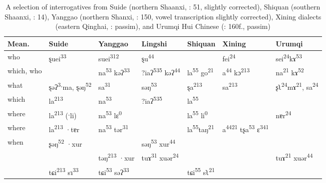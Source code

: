 \begin{table}[p]
\caption{A selection of interrogatives from Suide (northern Shaanxi, \citealt{Hei2013}: 51, slightly corrected), Shiquan (southern Shaanxi, \citealt{ShiFeng2009}: 14), Yanggao (northern Shanxi, \citealt{SunQinglin2015}: 150, vowel transcription slightly corrected), Xining dialects (eastern Qinghai, \citealt{ZhangChengzai1980}: passim), and Urumqi Hui Chinese (\citealt{LiuLiji1989}: 160f., passim)}
\label{tab:trans:8}

\begin{tabularx}{\textwidth}{XXXX XXX}
\lsptoprule
\textbf{Mean.} & \textbf{Suide} & \textbf{Yanggao} & \textbf{Lingshi} & \textbf{Shiquan} & \textbf{Xining} & \textbf{Urumqi}\\
\midrule
who & ȿuei\textsuperscript{33} & suei\textsuperscript{312} & ȿu\textsuperscript{44} &  & fei\textsuperscript{24} & sei\textsuperscript{24}kɤ\textsuperscript{53}\\
which, who &  & na\textsuperscript{53} kəʔ\textsuperscript{33} & ?iaʔ\textsuperscript{535} kəʔ\textsuperscript{44} & la\textsuperscript{55} go\textsuperscript{21} & a\textsuperscript{44} kɔ\textsuperscript{213} & na\textsuperscript{21} kɤ\textsuperscript{52}\\
what & ȿəʔ\textsuperscript{3}ˑma, ȿəŋ\textsuperscript{52} & sa\textsuperscript{31} & səŋ\textsuperscript{53} & ȿa\textsuperscript{213} & sa\textsuperscript{213} & ʂʅ\textsuperscript{24}mɤ\textsuperscript{21}, sa\textsuperscript{24}\\
which & la\textsuperscript{213} & na\textsuperscript{53} & ?iaʔ\textsuperscript{535} & la\textsuperscript{55} &  & \\
where & la\textsuperscript{213} (ˑli) & na\textsuperscript{53} lɛ\textsuperscript{0} &  & la\textsuperscript{55} li\textsuperscript{0} &  & nɐr\textsuperscript{24}\\
where & la\textsuperscript{213} ·tɐr & na\textsuperscript{53} tər\textsuperscript{31} &  & la\textsuperscript{55}taŋ\textsuperscript{21} & a\textsuperscript{4421} tʂa\textsuperscript{53} ɛ\textsuperscript{341} & \\
when & ʂəŋ\textsuperscript{52} ·xur &  & səŋ\textsuperscript{53} xur\textsuperscript{44} &  &  & \\
& & təŋ\textsuperscript{213} ·xur & tuɤ\textsuperscript{31} xuər\textsuperscript{24} &  &  & tuɤ\textsuperscript{21} xuər\textsuperscript{44}\\
& tɕi\textsuperscript{213} sɿ\textsuperscript{33} & tɕi\textsuperscript{53} səʔ\textsuperscript{33} &  & tɕi\textsuperscript{55} sʅ\textsuperscript{21} &  & \\

\end{tabularx}
\end{table}
